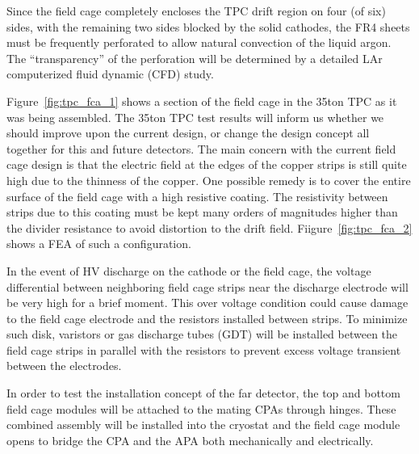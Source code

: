 Since the field cage completely encloses the TPC drift region on four (of six) sides, with the remaining two sides blocked by the solid cathodes, the FR4 sheets must 
be frequently perforated to allow natural convection of the liquid argon.  The ``transparency'' of the perforation will be determined by a detailed LAr computerized fluid dynamic (CFD) study.

Figure~\ref{fig:tpc_fca_1} shows a section of the field cage in the 35ton TPC as it was being assembled.  The 35ton TPC test results will inform us whether we should improve upon the current design, or change the design concept all together for this and future detectors.  The main concern with the current field cage design is that the electric field at the edges of the copper strips is still quite high due to the thinness of the copper.  One possible remedy is to cover the entire surface of the field cage with a high resistive coating.  The resistivity between strips due to this coating must be kept many orders of magnitudes higher than the divider resistance to avoid distortion to the drift field.  Fiigure~\ref{fig:tpc_fca_2} shows a FEA of such a configuration.

In the event of HV discharge on the cathode or the field cage, the voltage differential between neighboring field cage strips near the discharge electrode will be very high for a brief moment.  This over voltage condition could cause damage to the field cage electrode and the resistors installed between strips.  To minimize such disk, varistors or gas discharge tubes (GDT) will be installed between the field cage strips in parallel with the resistors to prevent excess voltage transient between the electrodes. 

In order to test the installation concept of the far detector, the top and bottom field cage modules will be attached to the mating CPAs through hinges.  These combined assembly will be installed into the cryostat and the field cage module opens to bridge the CPA and the APA both mechanically and electrically. 






